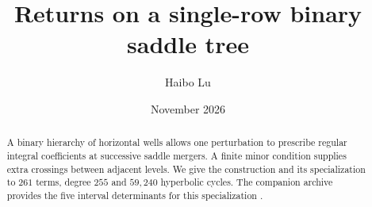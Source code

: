 
\geometry{top=21mm,bottom=20mm}
\renewcommand{\thesection}{B\arabic{section}}
\renewcommand{\thetable}{B\arabic{table}}
\setcounter{tocdepth}{1}
\title{Returns on a single-row binary saddle tree}
\author{Haibo Lu}
\date{November 2026}

\maketitle
\begin{abstract}
A binary hierarchy of horizontal wells allows one perturbation to prescribe regular integral coefficients at successive saddle mergers. A finite minor condition supplies extra crossings between adjacent levels. We give the construction and its specialization to \(261\) terms, degree \(255\) and \(59{,}240\) hyperbolic cycles. The companion archive provides the five interval determinants for this specialization \cite{LuReplay}.
\end{abstract}





